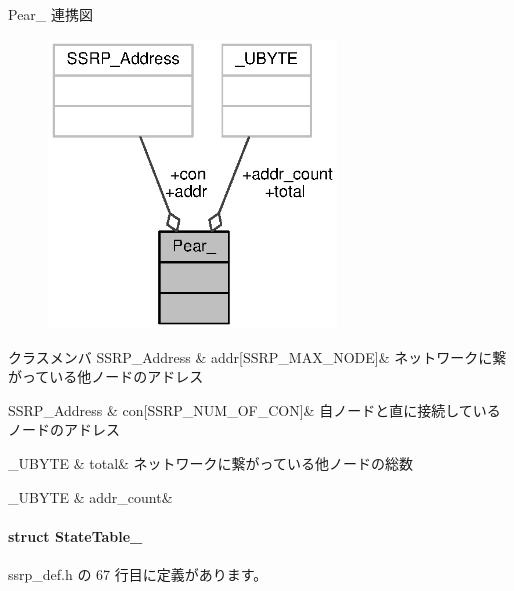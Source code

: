 Pear\+\_\+ 連携図\nopagebreak
\begin{figure}[H]
\begin{center}
\leavevmode
\includegraphics[width=217pt]{d6/d1f/structPear____coll__graph}
\end{center}
\end{figure}
\begin{DoxyFields}{クラスメンバ}
S\+S\+R\+P\+\_\+\+Address\label{ssrp__def_8h_a171360d4b9b2be90aa37e80a45590593}
&
addr\mbox{[}S\+S\+R\+P\+\_\+\+M\+A\+X\+\_\+\+N\+O\+D\+E\mbox{]}&
ネットワークに繋がっている他ノードのアドレス \\
\hline

S\+S\+R\+P\+\_\+\+Address\label{ssrp__def_8h_a4bfe3861b9bc152209282ba8b21212c1}
&
con\mbox{[}S\+S\+R\+P\+\_\+\+N\+U\+M\+\_\+\+O\+F\+\_\+\+C\+O\+N\mbox{]}&
自ノードと直に接続しているノードのアドレス \\
\hline

\+\_\+\+U\+B\+Y\+T\+E\label{ssrp__def_8h_a7d9673fe8d05730bc122c63f958da32c}
&
total&
ネットワークに繋がっている他ノードの総数 \\
\hline

\+\_\+\+U\+B\+Y\+T\+E\label{ssrp__def_8h_a158a62fe3945b5938d9860cb6343a56c}
&
addr\+\_\+count&
\\
\hline

\end{DoxyFields}
\label{structStateTable__}
\paragraph{struct State\+Table\+\_\+}


 ssrp\+\_\+def.\+h の 67 行目に定義があります。



